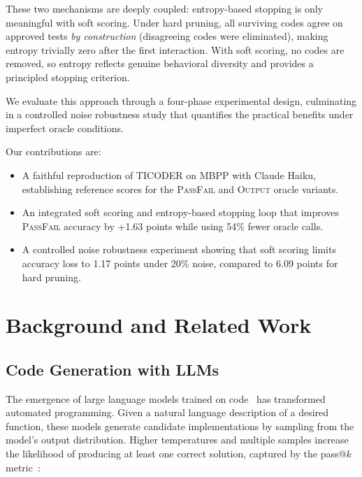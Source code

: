 \documentclass[conference]{IEEEtran}
\begin{document}
These two mechanisms are deeply coupled: entropy-based stopping is only meaningful with soft scoring. Under hard pruning, all surviving codes agree on approved tests \emph{by construction} (disagreeing codes were eliminated), making entropy trivially zero after the first interaction. With soft scoring, no codes are removed, so entropy reflects genuine behavioral diversity and provides a principled stopping criterion.

We evaluate this approach through a four-phase experimental design, culminating in a controlled noise robustness study that quantifies the practical benefits under imperfect oracle conditions.

Our contributions are:
\begin{itemize}
    \item A faithful reproduction of TICODER on MBPP with Claude Haiku, establishing reference scores for the \textsc{PassFail} and \textsc{Output} oracle variants.
    \item An integrated soft scoring and entropy-based stopping loop that improves \textsc{PassFail} accuracy by +1.63 points while using 54\% fewer oracle calls.
    \item A controlled noise robustness experiment showing that soft scoring limits accuracy loss to 1.17 points under 20\% noise, compared to 6.09 points for hard pruning.
\end{itemize}

\section{Background and Related Work}

\subsection{Code Generation with LLMs}

The emergence of large language models trained on code~\cite{chen2021codex, li2023starcoder, roziere2023codellama} has transformed automated programming. Given a natural language description of a desired function, these models generate candidate implementations by sampling from the model's output distribution. Higher temperatures and multiple samples increase the likelihood of producing at least one correct solution, captured by the pass@$k$ metric~\cite{chen2021codex}:
\end{document}
